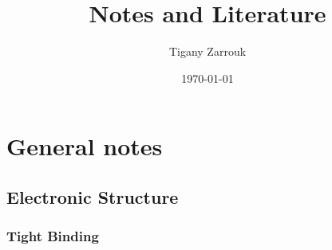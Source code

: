 \documentclass[11pt]{article}
\author{Tigany Zarrouk}
\date{\today}
\title{Notes and Literature}
\begin{document}
\maketitle
\tableofcontents



\section{General notes}
\label{sec:org986c3e7}

\subsection{Electronic Structure}
\label{sec:org481b94f}
\subsubsection{Tight Binding}
\label{sec:orgce36ee0}
\end{document}
